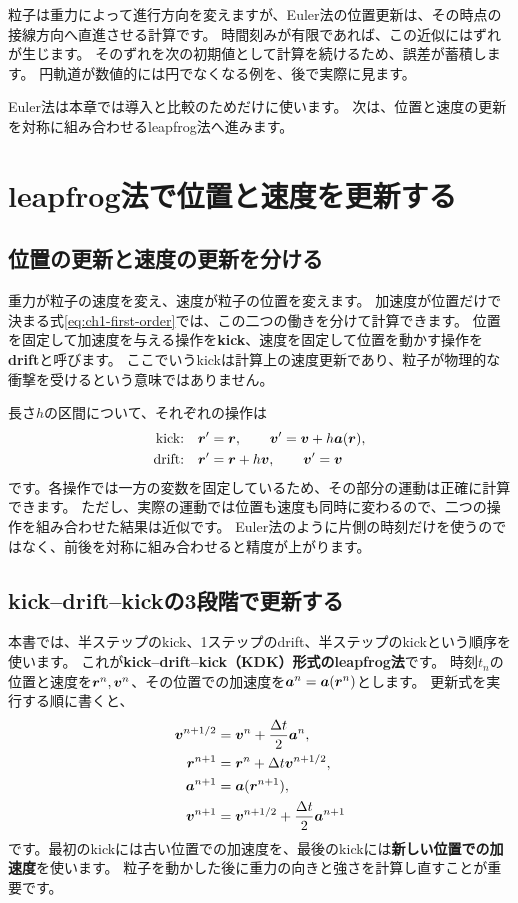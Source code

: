 粒子は重力によって進行方向を変えますが、Euler法の位置更新は、その時点の接線方向へ直進させる計算です。
時間刻みが有限であれば、この近似にはずれが生じます。
そのずれを次の初期値として計算を続けるため、誤差が蓄積します。
円軌道が数値的には円でなくなる例を、後で実際に見ます。

Euler法は本章では導入と比較のためだけに使います。
次は、位置と速度の更新を対称に組み合わせるleapfrog法へ進みます。

\section{leapfrog法で位置と速度を更新する}
\label{sec:ch1-leapfrog}

\subsection{位置の更新と速度の更新を分ける}

重力が粒子の速度を変え、速度が粒子の位置を変えます。
加速度が位置だけで決まる式\eqref{eq:ch1-first-order}では、この二つの働きを分けて計算できます。
位置を固定して加速度を与える操作を\textbf{kick}、速度を固定して位置を動かす操作を\textbf{drift}と呼びます。
ここでいうkickは計算上の速度更新であり、粒子が物理的な衝撃を受けるという意味ではありません。

長さ$h$の区間について、それぞれの操作は
\begin{align}
\text{kick:}\quad &\boldsymbol r' = \boldsymbol r,\qquad \boldsymbol v'=\boldsymbol v+h\boldsymbol a(\boldsymbol r),\nonumber\\
\text{drift:}\quad &\boldsymbol r'=\boldsymbol r+h\boldsymbol v,\qquad \boldsymbol v'=\boldsymbol v
\label{eq:ch1-kick-drift}
\end{align}
です。各操作では一方の変数を固定しているため、その部分の運動は正確に計算できます。
ただし、実際の運動では位置も速度も同時に変わるので、二つの操作を組み合わせた結果は近似です。
Euler法のように片側の時刻だけを使うのではなく、前後を対称に組み合わせると精度が上がります。

\subsection{kick--drift--kickの3段階で更新する}

本書では、半ステップのkick、1ステップのdrift、半ステップのkickという順序を使います。
これが\textbf{kick--drift--kick（KDK）形式のleapfrog法}です。\cite{simten2007}
時刻$t_n$の位置と速度を$\boldsymbol r^n,\boldsymbol v^n$、その位置での加速度を$\boldsymbol a^n=\boldsymbol a(\boldsymbol r^n)$とします。
更新式を実行する順に書くと、
\begin{align}
\boldsymbol v^{n+1/2} &= \boldsymbol v^n+\frac{\Delta t}{2}\boldsymbol a^n,
\label{eq:ch1-kdk-first-kick}\\
\boldsymbol r^{n+1} &= \boldsymbol r^n+\Delta t\boldsymbol v^{n+1/2},
\label{eq:ch1-kdk-drift}\\
\boldsymbol a^{n+1} &= \boldsymbol a(\boldsymbol r^{n+1}),
\label{eq:ch1-kdk-force}\\
\boldsymbol v^{n+1} &= \boldsymbol v^{n+1/2}+\frac{\Delta t}{2}\boldsymbol a^{n+1}
\label{eq:ch1-kdk-last-kick}
\end{align}
です。最初のkickには古い位置での加速度を、最後のkickには\textbf{新しい位置での加速度}を使います。
粒子を動かした後に重力の向きと強さを計算し直すことが重要です。


